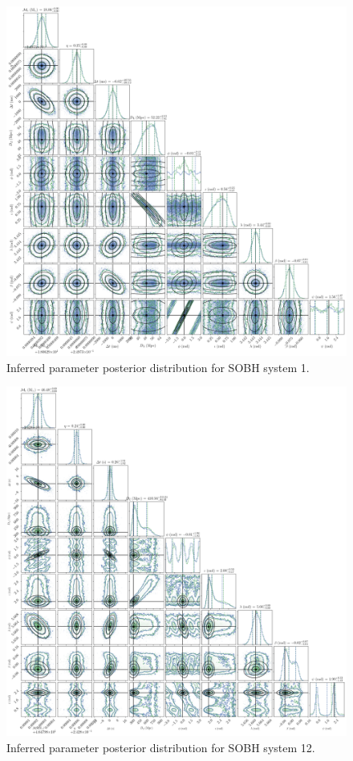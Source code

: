 \documentclass[aps,showpacs,twocolumn,prd,superscriptaddress,nofootinbib]{revtex4-1}
\begin{document}
\begin{figure}
	\includegraphics[width=\textwidth]{../plots/corner_sobh_tdc1_ptmcmc_bambi}
	\caption{Inferred parameter posterior distribution for SOBH system 1.}
	\label{fig:sobh_corner_1}
\end{figure}

\begin{figure}
	\includegraphics[width=\textwidth]{../plots/corner_sobh_tdc2_ptmcmc_bambi}
	\caption{Inferred parameter posterior distribution for SOBH system 12.}
	\label{fig:sobh_corner_12}
\end{figure}
\end{document}
